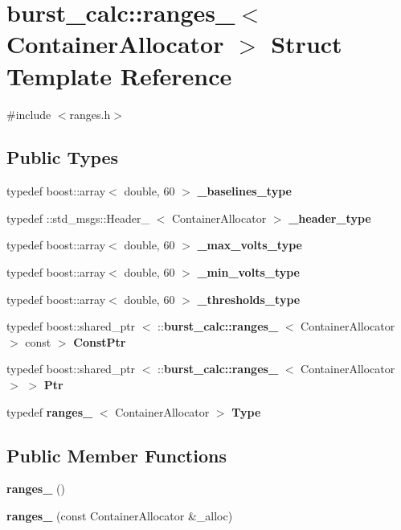 \section{burst\-\_\-calc\-:\-:ranges\-\_\-$<$ \-Container\-Allocator $>$ \-Struct \-Template \-Reference}
\label{structburst__calc_1_1ranges__}


{\ttfamily \#include $<$ranges.\-h$>$}

\subsection*{\-Public \-Types}
\begin{DoxyCompactItemize}
\item 
typedef boost\-::array$<$ double, 60 $>$ {\bf \-\_\-baselines\-\_\-type}
\item 
typedef \-::std\-\_\-msgs\-::\-Header\-\_\-\*
$<$ \-Container\-Allocator $>$ {\bf \-\_\-header\-\_\-type}
\item 
typedef boost\-::array$<$ double, 60 $>$ {\bf \-\_\-max\-\_\-volts\-\_\-type}
\item 
typedef boost\-::array$<$ double, 60 $>$ {\bf \-\_\-min\-\_\-volts\-\_\-type}
\item 
typedef boost\-::array$<$ double, 60 $>$ {\bf \-\_\-thresholds\-\_\-type}
\item 
typedef boost\-::shared\-\_\-ptr\*
$<$ \-::{\bf burst\-\_\-calc\-::ranges\-\_\-}\*
$<$ \-Container\-Allocator $>$ const  $>$ {\bf \-Const\-Ptr}
\item 
typedef boost\-::shared\-\_\-ptr\*
$<$ \-::{\bf burst\-\_\-calc\-::ranges\-\_\-}\*
$<$ \-Container\-Allocator $>$ $>$ {\bf \-Ptr}
\item 
typedef {\bf ranges\-\_\-}\*
$<$ \-Container\-Allocator $>$ {\bf \-Type}
\end{DoxyCompactItemize}
\subsection*{\-Public \-Member \-Functions}
\begin{DoxyCompactItemize}
\item 
{\bf ranges\-\_\-} ()
\item 
{\bf ranges\-\_\-} (const \-Container\-Allocator \&\-\_\-alloc)
\end{DoxyCompactItemize}
